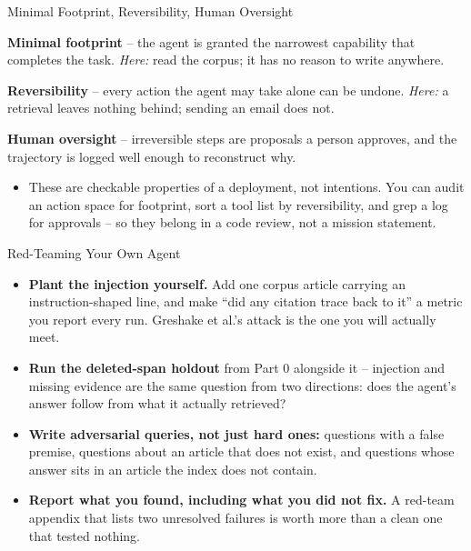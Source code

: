 \begin{frame}{Minimal Footprint, Reversibility, Human Oversight}
\begin{rldefinition}
\textbf{Minimal footprint} -- the agent is granted the narrowest capability that completes the task. \emph{Here:} read the corpus; it has no reason to write anywhere.

\smallskip
\textbf{Reversibility} -- every action the agent may take alone can be undone. \emph{Here:} a retrieval leaves nothing behind; sending an email does not.

\smallskip
\textbf{Human oversight} -- irreversible steps are proposals a person approves, and the trajectory is logged well enough to reconstruct why.
\end{rldefinition}
\pause
\begin{itemize}
  \item These are checkable properties of a deployment, not intentions. You can audit an action space for footprint, sort a tool list by reversibility, and grep a log for approvals -- so they belong in a code review, not a mission statement.
\end{itemize}
\end{frame}

\begin{frame}{Red-Teaming Your Own Agent}
\begin{itemize}
  \item \textbf{Plant the injection yourself.} Add one corpus article carrying an instruction-shaped line, and make ``did any citation trace back to it'' a metric you report every run. Greshake et al.'s attack is the one you will actually meet.
  \pause
  \item \textbf{Run the deleted-span holdout} from Part 0 alongside it -- injection and missing evidence are the same question from two directions: does the agent's answer follow from what it actually retrieved?
  \pause
  \item \textbf{Write adversarial queries, not just hard ones:} questions with a false premise, questions about an article that does not exist, and questions whose answer sits in an article the index does not contain.
  \pause
  \item \textbf{Report what you found, including what you did not fix.} A red-team appendix that lists two unresolved failures is worth more than a clean one that tested nothing.
\end{itemize}
\end{frame}

